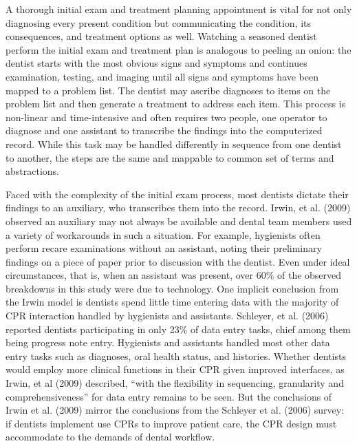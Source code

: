 \documentclass[11pt]{article}
\begin{document}
A thorough initial exam and treatment planning appointment is vital for not only diagnosing every present condition but communicating the condition, its consequences, and treatment options as well. Watching a seasoned dentist perform the initial exam and treatment plan is analogous to peeling an onion: the dentist starts with the most obvious signs and symptoms and continues examination, testing, and imaging until all signs and symptoms have been mapped to a problem list. The dentist may ascribe diagnoses to items on the problem list and then generate a treatment to address each item. This process is non-linear and time-intensive and often requires two people, one operator to diagnose and one assistant to transcribe the findings into the computerized record. While this task may be handled differently in sequence from one dentist to another, the steps are the same and mappable to common set of terms and abstractions.

Faced with the complexity of the initial exam process, most dentists dictate their findings to an auxiliary, who transcribes them into the record. Irwin, et al. (2009) observed an auxiliary may not always be available and dental team members used a variety of workarounds in such a situation. For example, hygienists often perform recare examinations without an assistant, noting their preliminary findings on a piece of paper prior to discussion with the dentist. Even under ideal circumstances, that is, when an assistant was present, over 60\% of the observed breakdowns in this study were due to technology. One implicit conclusion from the Irwin model is dentists spend little time entering data with the majority of CPR interaction handled by hygienists and assistants. Schleyer, et al. (2006) reported dentists participating in only 23\% of data entry tasks, chief among them being progress note entry. Hygienists and assistants handled most other data entry tasks such as diagnoses, oral health status, and histories. Whether dentists would employ more clinical functions in their CPR given improved interfaces, as Irwin, et al (2009) described, ``with the flexibility in sequencing, granularity and comprehensiveness'' for data entry remains to be seen. But the conclusions of Irwin et al. (2009) mirror the conclusions from the Schleyer et al. (2006) survey: if dentists implement use CPRs to improve patient care, the CPR design must accommodate to the demands of dental workflow.
\end{document}
